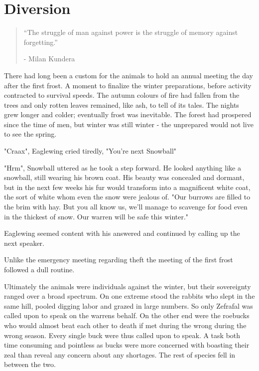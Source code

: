 \documentclass[smalldemyvopaper,11pt,twoside,onecolumn,openright,extrafontsizes]{memoir}
\begin{document}
\chapter{Diversion}

\vspace{-1.3cm}
\begin{localsize}{10}
	\begin{quote}
		“The struggle of man against power is the struggle of memory against forgetting.”
		\begin{flushright}- Milan Kundera \end{flushright}
	\end{quote} 
\end{localsize}
\vspace{1cm}


There had long been a custom for the animals to hold an annual meeting the day after the first frost. A moment to finalize the winter preparations, before activity contracted to survival speeds. The autumn colours of fire had fallen from the trees and only rotten leaves remained, like ash, to tell of its tales. The nights grew longer and colder; eventually frost was inevitable. The forest had prospered since the time of men, but winter was still winter - the unprepared would not live to see the spring. 
 
"Craax", Eaglewing cried tiredly, "You're next Snowball"

"Hrm", Snowball uttered as he took a step forward. He looked anything like a snowball, still wearing his brown coat. His beauty was concealed and dormant, but in the next few weeks his fur would transform into a magnificent white coat, the sort of white whom even the snow were jealous of. "Our burrows are filled to the brim with hay. But you all know us, we'll manage to scavenge for food even in the thickest of snow. Our warren will be safe this winter."

Eaglewing seemed content with his answered and continued by calling up the next speaker. 

Unlike the emergency meeting regarding theft the meeting of the first frost followed a dull routine. 

Ultimately the animals were individuals against the winter, but their sovereignty ranged over a broad spectrum. On one extreme stood the rabbits who slept in the same hill, pooled digging labor and grazed in large numbers. So only Zefrafal was called upon to speak on the warrens behalf. On the other end were the roebucks who would almost beat each other to death if met during the wrong during the wrong season. Every single buck were thus called upon to speak. A task both time consuming and pointless as bucks were more concerned with boasting their zeal than reveal any concern about any shortages. The rest of species fell in between the two.
\end{document}
